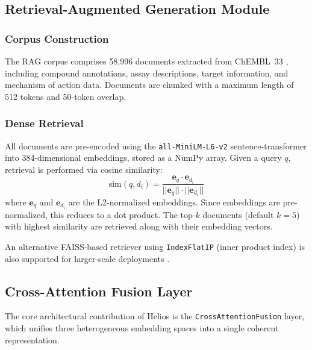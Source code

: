 \documentclass[conference]{IEEEtran}
\begin{document}
\subsection{Retrieval-Augmented Generation Module}

\subsubsection{Corpus Construction}
The RAG corpus comprises 58,996 documents extracted from ChEMBL~33 \cite{zdrazil2024chembl}, including compound annotations, assay descriptions, target information, and mechanism of action data. Documents are chunked with a maximum length of 512 tokens and 50-token overlap.

\subsubsection{Dense Retrieval}
All documents are pre-encoded using the \texttt{all-MiniLM-L6-v2} sentence-transformer \cite{reimers2019sentence} into 384-dimensional embeddings, stored as a NumPy array. Given a query $q$, retrieval is performed via cosine similarity:
\begin{equation}
    \text{sim}(q, d_i) = \frac{\mathbf{e}_q \cdot \mathbf{e}_{d_i}}{||\mathbf{e}_q|| \cdot ||\mathbf{e}_{d_i}||}
\end{equation}
where $\mathbf{e}_q$ and $\mathbf{e}_{d_i}$ are the L2-normalized embeddings. Since embeddings are pre-normalized, this reduces to a dot product. The top-$k$ documents (default $k=5$) with highest similarity are retrieved along with their embedding vectors.

An alternative FAISS-based retriever using \texttt{IndexFlatIP} (inner product index) is also supported for larger-scale deployments \cite{johnson2019faiss}.

\subsection{Cross-Attention Fusion Layer}
\label{sec:fusion}

The core architectural contribution of Helios is the \texttt{CrossAttentionFusion} layer, which unifies three heterogeneous embedding spaces into a single coherent representation.
\end{document}
